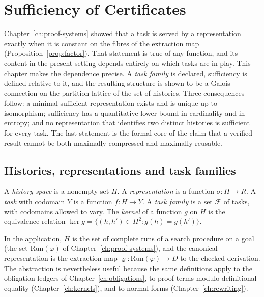 \chapter{Sufficiency of Certificates}
\label{ch:sufficiency}

Chapter~\ref{ch:proof-systems} showed that a task is served by a representation exactly when it is constant on the fibres of the extraction map (Proposition~\ref{prop:factor}). That statement is true of any function, and its content in the present setting depends entirely on which tasks are in play. This chapter makes the dependence precise. A \emph{task family} is declared, sufficiency is defined relative to it, and the resulting structure is shown to be a Galois connection on the partition lattice of the set of histories. Three consequences follow: a minimal sufficient representation exists and is unique up to isomorphism; sufficiency has a quantitative lower bound in cardinality and in entropy; and no representation that identifies two distinct histories is sufficient for every task. The last statement is the formal core of the claim that a verified result cannot be both maximally compressed and maximally reusable.

\section{Histories, representations and task families}

\begin{definition}[Setting]
\label{def:setting}
A \emph{history space} is a nonempty set $H$. A \emph{representation} is a function $\sigma:H\to R$. A \emph{task} with codomain $Y$ is a function $f:H\to Y$. A \emph{task family} is a set $\mathcal F$ of tasks, with codomains allowed to vary. The \emph{kernel} of a function $g$ on $H$ is the equivalence relation $\ker g=\{(h,h')\in H^2: g(h)=g(h')\}$.
\end{definition}

In the application, $H$ is the set of complete runs of a search procedure on a goal (the set $\mathrm{Run}(\varphi)$ of Chapter~\ref{ch:proof-systems}), and the canonical representation is the extraction map $\varrho:\mathrm{Run}(\varphi)\to D$ to the checked derivation. The abstraction is nevertheless useful because the same definitions apply to the obligation ledgers of Chapter~\ref{ch:obligations}, to proof terms modulo definitional equality (Chapter~\ref{ch:kernels}), and to normal forms (Chapter~\ref{ch:rewriting}).

